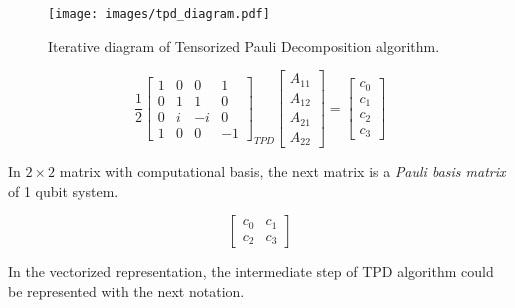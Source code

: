 \documentclass[twocolumn]{article}
\begin{document}
\begin{figure}[!h]
    \centering
    \texttt{[image: images/tpd\_diagram.pdf]}
    \caption{Iterative diagram of Tensorized Pauli Decomposition algorithm.}
    \label{fig:tpd_diagram}
\end{figure}

\begin{equation}
    \frac{1}{2}
    \begin{bmatrix}
        1 & 0 &  0 &  1\\
        0 & 1 &  1 &  0\\ 
        0 & i & -i &  0\\ 
        1 & 0 &  0 & -1 
    \end{bmatrix}_{TPD}
    \begin{bmatrix}
        A_{11} \\
        A_{12} \\
        A_{21} \\
        A_{22}
    \end{bmatrix} =
    \begin{bmatrix}
        c_0\\
        c_1\\
        c_2\\
        c_3
    \end{bmatrix}
\end{equation}

In $2 \times 2$ matrix with computational basis, the next matrix is a \textit{Pauli basis matrix} of 1 qubit system.

\begin{equation}
    \begin{bmatrix}
        c_0 & c_1\\
        c_2 & c_3
    \end{bmatrix}
\end{equation}

In the vectorized representation, the intermediate step of TPD algorithm 
could be represented with the next notation. 
\end{document}
